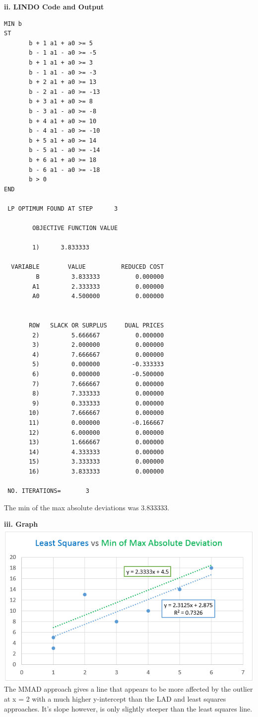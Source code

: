 \documentclass[paper=a4, fontsize=11pt]{scrartcl} %
\numberwithin{equation}{section} %
\numberwithin{figure}{section} %
\numberwithin{table}{section} %
\begin{document}
    \textbf{ii. LINDO Code and Output}\newline
    \begin{verbatim}
MIN b
ST
	   b + 1 a1 + a0 >= 5
	   b - 1 a1 - a0 >= -5
	   b + 1 a1 + a0 >= 3
	   b - 1 a1 - a0 >= -3
	   b + 2 a1 + a0 >= 13
	   b - 2 a1 - a0 >= -13
	   b + 3 a1 + a0 >= 8
	   b - 3 a1 - a0 >= -8
	   b + 4 a1 + a0 >= 10
	   b - 4 a1 - a0 >= -10
	   b + 5 a1 + a0 >= 14
	   b - 5 a1 - a0 >= -14
	   b + 6 a1 + a0 >= 18
	   b - 6 a1 - a0 >= -18
	   b > 0
END

 LP OPTIMUM FOUND AT STEP      3

        OBJECTIVE FUNCTION VALUE

        1)      3.833333

  VARIABLE        VALUE          REDUCED COST
         B         3.833333          0.000000
        A1         2.333333          0.000000
        A0         4.500000          0.000000


       ROW   SLACK OR SURPLUS     DUAL PRICES
        2)         5.666667          0.000000
        3)         2.000000          0.000000
        4)         7.666667          0.000000
        5)         0.000000         -0.333333
        6)         0.000000         -0.500000
        7)         7.666667          0.000000
        8)         7.333333          0.000000
        9)         0.333333          0.000000
       10)         7.666667          0.000000
       11)         0.000000         -0.166667
       12)         6.000000          0.000000
       13)         1.666667          0.000000
       14)         4.333333          0.000000
       15)         3.333333          0.000000
       16)         3.833333          0.000000

 NO. ITERATIONS=       3
    \end{verbatim}
    
    The min of the max absolute deviations was 3.833333.\newline
    
    \textbf{iii. Graph}\newline
    \includegraphics[width=\textwidth]{p3pbiii}
    The MMAD approach gives a line that appears to be more affected by the outlier at x = 2 with a much higher y-intercept than the LAD and least squares approaches. It's slope however, is only slightly steeper than the least squares line. \newline
    
\end{document}
